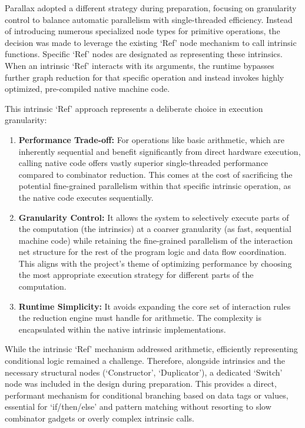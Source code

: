 Parallax adopted a different strategy during preparation, focusing on granularity control to balance automatic parallelism with single-threaded efficiency. Instead of introducing numerous specialized node types for primitive operations, the decision was made to leverage the existing `Ref' node mechanism to call intrinsic functions. Specific `Ref' nodes are designated as representing these intrinsics. When an intrinsic `Ref' interacts with its arguments, the runtime bypasses further graph reduction for that specific operation and instead invokes highly optimized, pre-compiled native machine code.

This intrinsic `Ref' approach represents a deliberate choice in execution granularity:

\begin{enumerate}
    \item \textbf{Performance Trade-off:} For operations like basic arithmetic, which are inherently sequential and benefit significantly from direct hardware execution, calling native code offers vastly superior single-threaded performance compared to combinator reduction. This comes at the cost of sacrificing the potential fine-grained parallelism within that specific intrinsic operation, as the native code executes sequentially.
    \item \textbf{Granularity Control:} It allows the system to selectively execute parts of the computation (the intrinsics) at a coarser granularity (as fast, sequential machine code) while retaining the fine-grained parallelism of the interaction net structure for the rest of the program logic and data flow coordination. This aligns with the project's theme of optimizing performance by choosing the most appropriate execution strategy for different parts of the computation.
    \item \textbf{Runtime Simplicity:} It avoids expanding the core set of interaction rules the reduction engine must handle for arithmetic. The complexity is encapsulated within the native intrinsic implementations.
\end{enumerate}

While the intrinsic `Ref' mechanism addressed arithmetic, efficiently representing conditional logic remained a challenge. Therefore, alongside intrinsics and the necessary structural nodes (`Constructor', `Duplicator'), a dedicated `Switch' node was included in the design during preparation. This provides a direct, performant mechanism for conditional branching based on data tags or values, essential for `if/then/else' and pattern matching without resorting to slow combinator gadgets or overly complex intrinsic calls.

